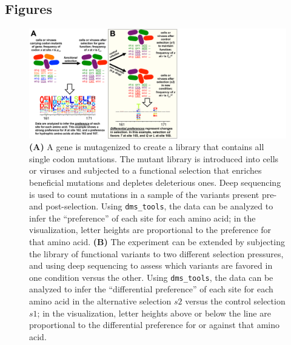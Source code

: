 \documentclass[twocolumn]{bmcart}%
\begin{document}
\begin{backmatter}


\clearpage
\onecolumn

\section*{Figures}

\begin{figure}[h!]
\centerline{\includegraphics[clip, trim=0in 0in 5.92in 0in, width=5.5in]{Fig_DeepMutationalScan/Fig_DeepMutationalScan.pdf}}
\caption{\label{fig:DeepMutationalScan}{ {\bf (A)} A gene is mutagenized to create a library that contains all single codon mutations. The mutant library is introduced into cells or viruses and subjected to a functional selection that enriches beneficial mutations and depletes deleterious ones. Deep sequencing is used to count mutations in a sample of the variants present pre- and post-selection. Using \texttt{dms\_tools}, the data can be analyzed to infer the ``preference'' of each site for each amino acid; in the visualization, letter heights are proportional to the preference for that amino acid. {\bf (B)} The experiment can be extended by subjecting the library of functional variants to two different selection pressures, and using deep sequencing to assess which variants are favored in one condition versus the other. Using \texttt{dms\_tools}, the data can be analyzed to infer the ``differential preference'' of each site for each amino acid in the alternative selection $s2$ versus the control selection $s1$; in the visualization, letter heights above or below the line are proportional to the differential preference for or against that amino acid.}}
\end{figure}


\end{backmatter}
\end{document}
